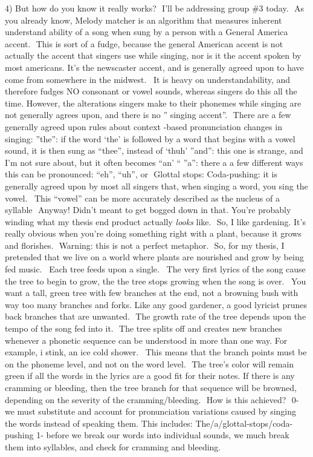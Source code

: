 \documentclass[10pt,oneside]{memoir}
\begin{document}
4) But how do you know it really works?  I'll be addressing group \#3 today.  As you already know, Melody matcher is an algorithm that measures inherent understand ability of a song when sung by a person with a General America accent.  This is sort of a fudge, because the general American accent is not actually the accent that singers use while singing, nor is it the accent spoken by most americans. It's the newscaster accent, and is generally agreed upon to have come from somewhere in the midwest. ~It is heavy on understandability, and therefore fudges NO consonant or vowel sounds, whereas singers do this all the time. However, the alterations singers make to their phonemes while singing are not generally agrees upon, and there is no '' singing accent''.  There are a few generally agreed upon rules about context -based pronunciation changes in singing: ''the'': if the word `the' is followed by a word that begins with a vowel sound, it is then sung as ``thee'', instead of `thuh' ''and'': this one is strange, and I'm not sure about, but it often becomes ``an' `` ''a'': there a a few different ways this can be pronounced: ``eh'', ``uh'', or {\itshape {\itshape }} Glottal stops: Coda-pushing: it is generally agreed upon by most all singers that, when singing a word, you sing the vowel. ~This ``vowel'' can be more accurately described as the nucleus of a syllable  Anyway! Didn't meant to get bogged down in that. You're probably winding what my thesis end product actually {\itshape looks} like.  So, I like gardening. It's really obvious when you're doing something right with a plant, because it grows and florishes.  Warning: this is not a perfect metaphor.  So, for my thesis, I pretended that we live on a world where plants are nourished and grow by being fed music. ~Each tree feeds upon a single. ~The very first lyrics of the song cause the tree to begin to grow, the the tree stops growing when the song is over. ~You want a tall, green tree with few branches at the end, not a browning bush with way too many branches and forks. Like any good gardener, a good lyricist prunes back branches that are unwanted.  The growth rate of the tree depends upon the tempo of the song fed into it.  The tree splits off and creates new branches whenever a phonetic sequence can be understood in more than one way. For example, i stink, an ice cold shower. ~This means that the branch points must be on the phoneme level, and not on the word level.  The tree's color will remain green if all the words in the lyrics are a good fit for their notes. If there is any cramming or bleeding, then the tree branch for that sequence will be browned, depending on the severity of the cramming/bleeding.  How is this achieved?  0- we must substitute and account for pronunciation variations caused by singing the words instead of speaking them. This includes: The/a/glottal-stops/coda-pushing 1- before we break our words into individual sounds, we much break them into syllables, and check for cramming and bleeding.
\end{document}
